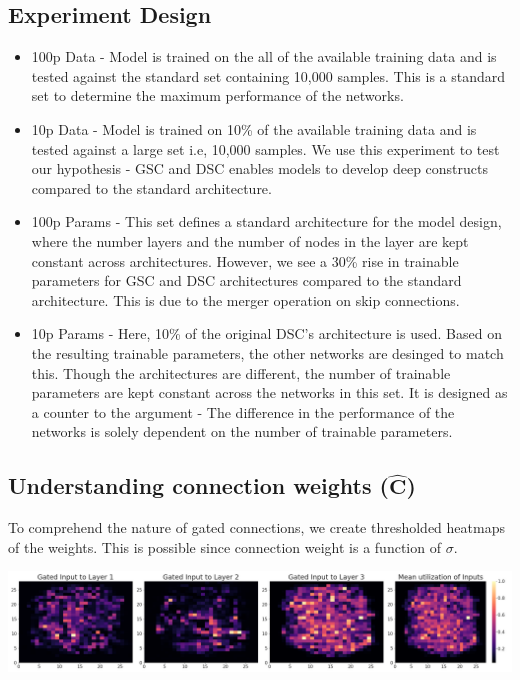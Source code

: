 \documentclass{article}
\let\oldhat\hat
\renewcommand{\hat}[1]{\oldhat{\mathbf{#1}}}
\begin{document}
\subsection{Experiment Design}
\begin{itemize}
\item 100p Data - Model is trained on the all of the available training data and is tested against the standard set containing 10,000 samples. This is a standard set to determine the maximum performance of the networks.
\item 10p Data - Model is trained on 10\% of the available training data and is tested against a large set i.e, 10,000 samples. We use this experiment to test our hypothesis - GSC and DSC enables models to develop deep constructs compared to the standard architecture.
\item 100p Params - This set defines a standard architecture for the model design, where the number layers and the number of nodes in the layer are kept constant across architectures. However, we see a 30\% rise in trainable parameters for GSC and DSC architectures compared to the standard architecture. This is due to the merger operation on skip connections.
\item 10p Params - Here, 10\% of the original DSC's architecture is used. Based on the resulting trainable parameters, the other networks are desinged to match this. Though the architectures are different, the number of trainable parameters are kept constant across the networks in this set. It is designed as a counter to the argument - The difference in the performance of the networks is solely dependent on the number of trainable parameters.
\end{itemize}


\subsection{Understanding connection weights ($\hat{C}$)}
To comprehend the nature of gated connections, we create thresholded heatmaps of the weights. This is possible since connection weight is a function of $\sigma$. 

\centering
\includegraphics[scale=0.2]{paper/mnist_vis.png}
\label{fig:cscore_100p_model.png}
\end{document}
